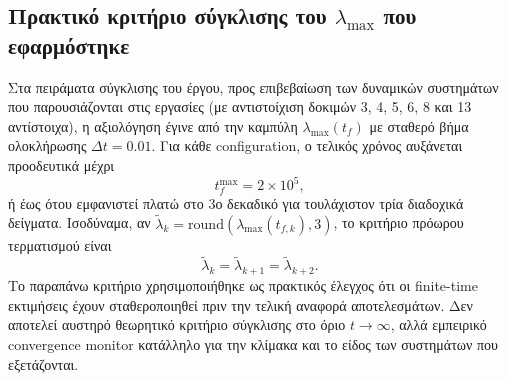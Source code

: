 \documentclass[11pt,a4paper]{report}
\begin{document}
\subsection{Πρακτικό κριτήριο σύγκλισης του \texorpdfstring{$\lambda_{\max}$}{lambda\_max} που εφαρμόστηκε}
Στα πειράματα σύγκλισης του έργου, προς επιβεβαίωση των δυναμικών συστημάτων που
παρουσιάζονται στις εργασίες \cite{pham2014_no_equilibrium,pham2017_rounded_square,
volos2016_hidden_sync,pham2016_hyperjerk_memristive,volos2016_hindmarsh_sync,
wang2017_four_wing} (με αντιστοίχιση δοκιμών 3, 4, 5, 6, 8 και 13 αντίστοιχα),
η αξιολόγηση έγινε από την
καμπύλη $\lambda_{\max}(t_f)$ με σταθερό βήμα ολοκλήρωσης $\Delta t=0.01$.
Για κάθε configuration, ο τελικός χρόνος αυξάνεται προοδευτικά μέχρι
\begin{equation}
t_f^{\max}=2\times 10^5,
\end{equation}
ή έως ότου εμφανιστεί πλατώ στο 3ο δεκαδικό για τουλάχιστον τρία
διαδοχικά δείγματα. Ισοδύναμα, αν
$\widetilde\lambda_k=\mathrm{round}(\lambda_{\max}(t_{f,k}),3)$,
το κριτήριο πρόωρου τερματισμού είναι
\begin{equation}
\widetilde\lambda_k=\widetilde\lambda_{k+1}=\widetilde\lambda_{k+2}.
\end{equation}
Το παραπάνω κριτήριο χρησιμοποιήθηκε ως πρακτικός έλεγχος ότι οι finite-time
εκτιμήσεις έχουν σταθεροποιηθεί πριν την τελική αναφορά αποτελεσμάτων.
Δεν αποτελεί αυστηρό θεωρητικό κριτήριο σύγκλισης στο όριο $t\to\infty$, αλλά
εμπειρικό convergence monitor κατάλληλο για την κλίμακα και το είδος των συστημάτων που εξετάζονται.
\end{document}
